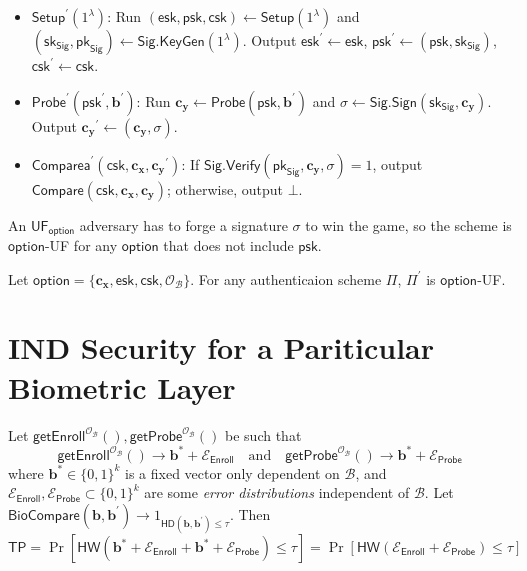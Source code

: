 \begin{itemize}

	\item $\textsf{Setup}^\prime (1^\lambda)$: Run $(\textsf{esk}, \textsf{psk}, \textsf{csk}) \gets \textsf{Setup}(1^\lambda)$ and $(\textsf{sk}_{\textsf{Sig}}, \textsf{pk}_{\textsf{Sig}}) \gets \textsf{Sig.KeyGen}(1^\lambda)$. Output $\textsf{esk}^\prime \gets \textsf{esk}$, $\textsf{psk}^\prime \gets (\textsf{psk}, \textsf{sk}_{\textsf{Sig}})$, $\textsf{csk}^\prime \gets \textsf{csk}$.

	\item $\textsf{Probe}^\prime (\textsf{psk}^\prime, \mathbf{b}^\prime)$: Run $\mathbf{c_y} \gets \textsf{Probe}(\textsf{psk}, \mathbf{b}^\prime)$ and $\sigma \gets \textsf{Sig.Sign}(\textsf{sk}_{\textsf{Sig}}, \mathbf{c_y})$. Output $\mathbf{c_y}^\prime \gets (\mathbf{c_y}, \sigma)$.

	\item $\textsf{Comparea}^\prime (\textsf{csk}, \mathbf{c_x}, \mathbf{c_y}^\prime)$: If $\textsf{Sig.Verify}(\textsf{pk}_{\textsf{Sig}}, \mathbf{c_y}, \sigma) = 1$, output $\textsf{Compare}(\textsf{csk}, \mathbf{c_x}, \mathbf{c_y})$; otherwise, output $\bot$.

\end{itemize}

An $\textsf{UF}_\textsf{option}$ adversary has to forge a signature $\sigma$ to win the game, so the scheme is $\textsf{option}$-UF for any $\textsf{option}$ that does not include $\textsf{psk}$. 

\begin{theorem}
\label{thm:sEUF-CMA-esk-csk}
	Let $\textsf{option} = \{ \mathbf{c_x}, \textsf{esk}, \textsf{csk}, \mathcal{O}_\mathcal{B} \}$. For any authenticaion scheme $\Pi$, $\Pi^\prime$ is $\textsf{option}$-UF. 
\end{theorem}


\section{IND Security for a Pariticular Biometric Layer}

Let $\textsf{getEnroll}^{\mathcal{O}_{\mathcal{B}}}(), \textsf{getProbe}^{\mathcal{O}_{\mathcal{B}}}()$ be such that
\[
	\textsf{getEnroll}^{\mathcal{O}_{\mathcal{B}}}() \to \mathbf{b}^* + \mathcal{E}_{\textsf{Enroll}}  \quad \text{and} \quad \textsf{getProbe}^{\mathcal{O}_{\mathcal{B}}}() \to \mathbf{b}^* + \mathcal{E}_{\textsf{Probe}}
\]
where $\mathbf{b}^* \in \{0, 1\}^k$ is a fixed vector only dependent on $\mathcal{B}$, and $\mathcal{E}_{\textsf{Enroll}}, \mathcal{E}_{\textsf{Probe}} \subset \{0, 1\}^k$ are some \emph{error distributions} independent of $\mathcal{B}$. Let $\textsf{BioCompare}(\mathbf{b}, \mathbf{b}^\prime) \to 1_{\textsf{HD}(\mathbf{b}, \mathbf{b}^\prime) \leq \tau}$. Then
\[
	\textsf{TP} = \Pr[ \textsf{HW}(\mathbf{b}^* + \mathcal{E}_{\textsf{Enroll}} + \mathbf{b}^* + \mathcal{E}_{\textsf{Probe}}) \leq \tau ] = \Pr[ \textsf{HW}(\mathcal{E}_{\textsf{Enroll}} + \mathcal{E}_{\textsf{Probe}}) \leq \tau ]
\]

